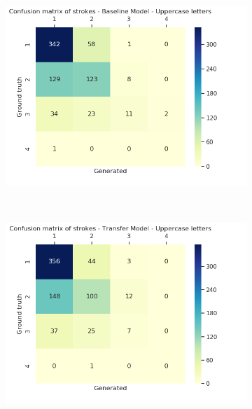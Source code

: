       \begin{figure}[!htbp]
        \centering
        \begin{subfigure}[tb]{0.45\textwidth}
            \includegraphics[width=\textwidth]{images/sota/ironoff_results/True_upper_strokes_heatmap.png}
        \end{subfigure}
        ~
        \begin{subfigure}[tb]{0.45\textwidth}
            \includegraphics[width=\textwidth]{images/sota/ironoff_results/False_upper_strokes_heatmap.png}
        \end{subfigure}


\end{figure}
